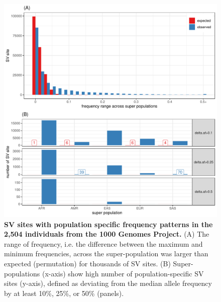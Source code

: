 \documentclass[11pt]{ucscthesis}
\begin{document}
\begin{figure}[H]
  \includegraphics[width=\linewidth]{fig-pops-freq-kgp.pdf}
  \caption[SV sites with population specific frequency patterns in the 2,504 individuals from the 1000 Genomes Project]{{\bf SV sites with population specific frequency patterns in the 2,504 individuals from the 1000 Genomes Project. }
    (A) The range of frequency, i.e. the difference between the maximum and minimum frequencies, across the super-population was larger than expected (permutation) for thousands of SV sites.
    (B) Super-populations (x-axis) show high number of population-specific SV sites (y-axis), defined as deviating from the median allele frequency by at least 10\%, 25\%, or 50\% (panels).}
  \label{fig:1kgp-pop-freq}
\end{figure}
\end{document}
